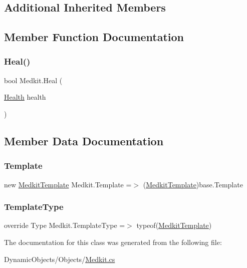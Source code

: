 \subsection*{Additional Inherited Members}


\subsection{Member Function Documentation}
\mbox{\label{class_medkit_acce3562cfef5e560401f38e2d1e90be0}} 
\subsubsection{\texorpdfstring{Heal()}{Heal()}}
{\footnotesize\ttfamily bool Medkit.\+Heal (\begin{DoxyParamCaption}\item[{\mbox{\hyperlink{class_health}{Health}}}]{health }\end{DoxyParamCaption})}



\subsection{Member Data Documentation}
\mbox{\label{class_medkit_a8b0cad26868935be56d6fffbb7015e07}} 
\subsubsection{\texorpdfstring{Template}{Template}}
{\footnotesize\ttfamily new \mbox{\hyperlink{class_medkit_template}{Medkit\+Template}} Medkit.\+Template =$>$ (\mbox{\hyperlink{class_medkit_template}{Medkit\+Template}})base.\+Template}

\mbox{\label{class_medkit_ae9ac0491aaac1e29888088fc9d2278ee}} 
\subsubsection{\texorpdfstring{Template\+Type}{TemplateType}}
{\footnotesize\ttfamily override Type Medkit.\+Template\+Type =$>$ typeof(\mbox{\hyperlink{class_medkit_template}{Medkit\+Template}})\hspace{0.3cm}{\ttfamily [protected]}}



The documentation for this class was generated from the following file\+:\begin{DoxyCompactItemize}
\item 
Dynamic\+Objects/\+Objects/\mbox{\hyperlink{_medkit_8cs}{Medkit.\+cs}}\end{DoxyCompactItemize}
